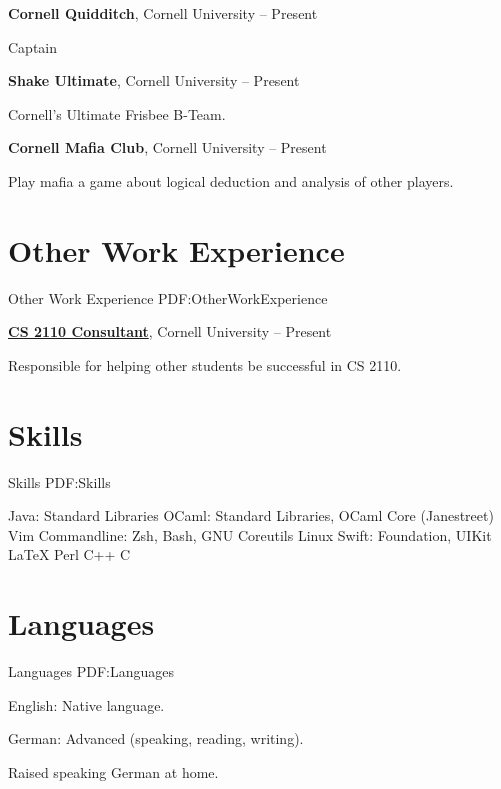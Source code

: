 \documentclass[letterpaper,10pt,oneside]{simpleresumecv}
\begin{document}
\begin{body}
{\textbf{Cornell Quidditch}},
Cornell University
\hfill
{} --
Present

\GapNoBreak%
\BulletItem%
Captain

{\textbf{Shake Ultimate}},
Cornell University
\hfill
{} --
Present

\GapNoBreak%
\BulletItem%
Cornell's Ultimate Frisbee B-Team.

{\textbf{Cornell Mafia Club}},
Cornell University
\hfill
{} --
Present

\GapNoBreak%
\BulletItem%
Play mafia a game about logical deduction and analysis of other players.


\section%
{Other Work\newline
Experience}
{Other Work Experience}
{PDF:OtherWorkExperience}

\href{http://www.example.com/my-company}
{\textbf{CS 2110 Consultant}},
Cornell University
\hfill
{} --
Present

\GapNoBreak%
\BulletItem%
Responsible for helping other students be successful in CS 2110.


\section%
{Skills}
{Skills}
{PDF:Skills}

\BulletItem%
Java: Standard Libraries
\BulletItem%
OCaml: Standard Libraries, OCaml Core (Janestreet)
\BulletItem%
Vim
\BulletItem%
Commandline: Zsh, Bash, GNU Coreutils
\BulletItem%
Linux
\BulletItem%
Swift: Foundation, UIKit
\BulletItem%
{\LaTeX}
\BulletItem%
Perl
\BulletItem%
C++
\BulletItem%
C


\section%
{Languages}
{Languages}
{PDF:Languages}

\BulletItem%
English: Native language.

\GapNoBreak%
\BulletItem%
German: Advanced (speaking, reading, writing).
\begin{detail}
\SubBulletItem%
Raised speaking German at home.
\end{detail}


\end{body}
\end{document}
